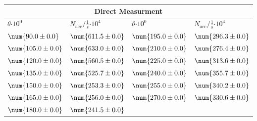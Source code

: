 \begin{tabular}{|p{}|p{}||p{}|p{}|}
\hline
\multicolumn{4}{|c|}{Direct Measurment}\\
\hline
$\theta$$\cdot 10^{0}$&$N_\text{acc}/\frac{1}{s}$$\cdot 10^{4}$&$\theta$$\cdot 10^{0}$&$N_\text{acc}/\frac{1}{s}$$\cdot 10^{4}$\\
\hline
$\num{90.0\pm 0.0}$&$\num{611.5\pm 0.0}$&$\num{195.0\pm 0.0}$&$\num{296.3\pm 0.0}$\\
$\num{105.0\pm 0.0}$&$\num{633.0\pm 0.0}$&$\num{210.0\pm 0.0}$&$\num{276.4\pm 0.0}$\\
$\num{120.0\pm 0.0}$&$\num{560.5\pm 0.0}$&$\num{225.0\pm 0.0}$&$\num{313.6\pm 0.0}$\\
$\num{135.0\pm 0.0}$&$\num{525.7\pm 0.0}$&$\num{240.0\pm 0.0}$&$\num{355.7\pm 0.0}$\\
$\num{150.0\pm 0.0}$&$\num{253.3\pm 0.0}$&$\num{255.0\pm 0.0}$&$\num{340.2\pm 0.0}$\\
$\num{165.0\pm 0.0}$&$\num{256.0\pm 0.0}$&$\num{270.0\pm 0.0}$&$\num{330.6\pm 0.0}$\\
$\num{180.0\pm 0.0}$&$\num{241.5\pm 0.0}$&&\\
\hline
\end{tabular}